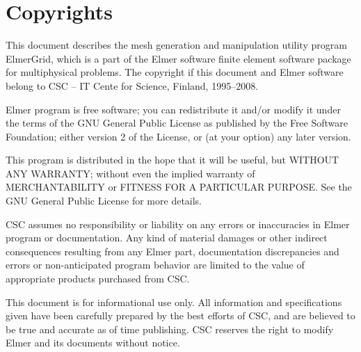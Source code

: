 \chapter*{Copyrights}

This document describes the mesh generation and manipulation utility 
program ElmerGrid, which is a part of the Elmer software
finite element software package for multiphysical problems.
The copyright if this document and Elmer software belong to
CSC -- IT Cente for Science, Finland, 1995--2008. 

Elmer program is free software; you can redistribute it and/or
modify it under the terms of the GNU General Public License
as published by the Free Software Foundation; either version 2
of the License, or (at your option) any later version.

This program is distributed in the hope that it will be useful,
but WITHOUT ANY WARRANTY; without even the implied warranty of
MERCHANTABILITY or FITNESS FOR A PARTICULAR PURPOSE.  See the
GNU General Public License for more details.

CSC assumes no responsibility or liability on any errors or inaccuracies in 
Elmer program or documentation. Any kind of material damages or other indirect
consequences resulting from any Elmer part, documentation discrepancies and 
errors or non-anticipated program behavior are limited to the value of 
appropriate products purchased from CSC. 

This document is for informational use only. All information and specifications
given have been carefully prepared by the best efforts of CSC, and are believed
to be true and accurate as of time publishing. CSC reserves the right to 
modify Elmer and its documents without notice. \\  \mbox{} \\

